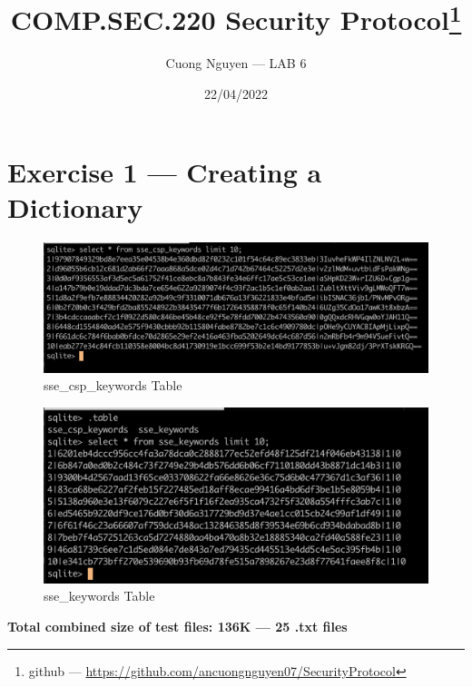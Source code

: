 \documentclass{article}
\title{COMP.SEC.220 Security Protocol\footnote{github --- \url{https://github.com/ancuongnguyen07/SecurityProtocol}}}
\author{Cuong Nguyen --- LAB 6}
\date{22/04/2022}
\begin{document}
    
\maketitle

\section*{Exercise 1 --- Creating a Dictionary}

\begin{figure}
    \centering
    \includegraphics[height=\textheight,width=\textwidth,
    keepaspectratio]{sse_csp_keywords_table.png}
    \caption{sse_csp_keywords Table}
    \label{fig:sse_csp_keywords}
\end{figure}

\begin{figure}
    \centering
    \includegraphics[height=\textheight,width=\textwidth,
    keepaspectratio]{sse_keywords_table.png}
    \caption{sse_keywords Table}
    \label{fig:sse_keywords}
\end{figure}

\textbf{Total combined size of test files: 136K --- 25 .txt files}
\end{document}
